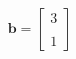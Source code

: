 \documentclass[preview]{standalone}
\begin{document}
\begin{align*}
\mathbf{b} = \begin{bmatrix}3 \\ \\ 1 \end{bmatrix}
\end{align*}
\end{document}
